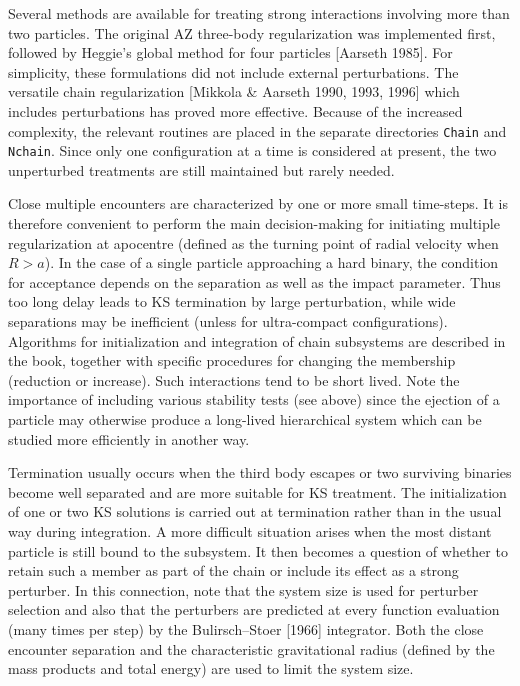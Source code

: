 \documentclass[12pt]{article}
\begin{document}
Several methods are available for treating strong interactions involving more
than two particles.
The original AZ three-body regularization was implemented first, followed by
Heggie's global method for four particles [\cf Aarseth 1985].
For simplicity, these formulations did not include external perturbations.
The versatile chain regularization [Mikkola \& Aarseth 1990, 1993, 1996]
which includes perturbations has proved more effective.
Because of the increased complexity, the relevant routines are placed in the
separate directories {\tt Chain} and {\tt Nchain}.
Since only one configuration at a time is considered at present, the two
unperturbed treatments are still maintained but rarely needed.

Close multiple encounters are characterized by one or more small \cm
time-steps.
It is therefore convenient to perform the main decision-making for initiating
multiple regularization at apocentre (defined as the turning point of radial
velocity when $R > a$).
In the case of a single particle approaching a hard binary, the condition
for acceptance depends on the separation as well as the impact parameter.
Thus too long delay leads to KS termination by large perturbation, while
wide separations may be inefficient (unless for ultra-compact
configurations).
Algorithms for initialization and integration of chain subsystems are
described in the book, together with specific procedures for changing the
membership (reduction or increase).
Such interactions tend to be short lived.
Note the importance of including various stability tests (see above) since
the ejection of a particle may otherwise produce a long-lived hierarchical
system which can be studied more efficiently in another way.

Termination usually occurs when the third body escapes or two surviving
binaries become well separated and are more suitable for KS treatment.
The initialization of one or two KS solutions is carried out at termination
rather than in the usual way during integration.
A more difficult situation arises when the most distant particle is still
bound to the subsystem.
It then becomes a question of whether to retain such a member as part of
the chain or include its effect as a strong perturber.
In this connection, note that the system size is used for perturber
selection and also that the perturbers are predicted at every function
evaluation (\ie many times per step) by the Bulirsch--Stoer [1966]
integrator.
Both the close encounter separation and the characteristic gravitational
radius (defined by the mass products and total energy) are used to limit
the system size.
\end{document}
